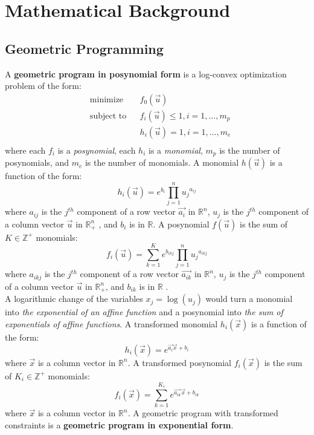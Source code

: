 \section{Mathematical Background}
\subsection{Geometric Programming}
A \textbf{geometric program in posynomial form} is a log-convex optimization problem of the form:
\begin{equation}
\begin{aligned}
	& \text{minimize} && f_0 \left(\vec{u}\right) \\
	& \text{subject to} && f_i \left(\vec{u}\right) \leq 1, i = 1,...,m_p\\
	& && h_i \left(\vec{u}\right) = 1, i = 1, ...,m_e\\
\end{aligned}
\label{GP_standard}
\end{equation}
where each $f_i$ is a {\em posynomial}, each $h_i$ is a {\em monomial}, $m_p$ is the number of posynomials, and $m_e$ is the number of monomials. A monomial $h(\vec{u})$ is a function of the form:
\begin{displaymath}
	h_i(\vec{u}) = e^{b_i}\textstyle{\prod}_{j=1}^{n}{u_j}^{a_{ij}}
\end{displaymath}
where $a_{ij}$ is the $j^{th}$ component of a row vector $\vec{a_i}$ in $\mathbb{R}^n$, $u_j$ is the $j^{th}$ component of a column vector $\vec{u}$ in $\mathbb{R}^n_+$ , and $b_i$ is in $\mathbb{R}$. A posynomial $f(\vec{u})$ is the sum of $K \in \mathbb{Z}^+$ monomials:
\begin{displaymath}
	f_i(\vec{u}) = \textstyle{\sum_{k=1}^{K}}e^{b_{ikj}}\prod_{j=1}^{n}{u_j}^{a_{ikj}}
\end{displaymath}
where $a_{ikj}$ is the $j^{th}$ component of a row vector $\vec{a_{ik}}$ in $\mathbb{R}^n$, $u_j$ is the $j^{th}$ component of a column vector $\vec{u}$ in $\mathbb{R}^n_+$, and $b_{ik}$ is in $\mathbb{R}$ \cite{GP_tutorial}.\\
A logarithmic change of the variables $x_j = \log(u_j)$ would turn a monomial into {\em  the exponential of an affine function} and a posynomial into {\em the sum of exponentials of affine functions}. A transformed monomial $h_i(\vec{x})$ is a function of the form:
\begin{displaymath}
    h_i(\vec{x}) = e^{\vec{a_i}\vec{x} + b_i}
\end{displaymath}
where $\vec{x}$ is a column vector in $\mathbb{R}^n$. A transformed posynomial $f_i(\vec{x})$ is the sum of $K_i \in \mathbb{Z}^+$ monomials:
\begin{displaymath}
    f_i(\vec{x}) = \textstyle{\sum_{k=1}^{K_i}}e^{\vec{a_{ik}}\vec{x} + b_{ik}}
\end{displaymath}
where $\vec{x}$ is a column vector in $\mathbb{R}^n$. A geometric program with transformed constraints is a \textbf{geometric program in exponential form}.

